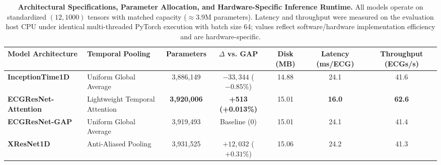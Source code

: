 \begin{table}[t]
\centering
\small
\caption{\textbf{Architectural Specifications, Parameter Allocation, and Hardware-Specific Inference Runtime.} All models operate on standardized $(12, 1000)$ tensors with matched capacity ($\approx 3.9$M parameters). Latency and throughput were measured on the evaluation host CPU under identical multi-threaded PyTorch execution with batch size 64; values reflect software/hardware implementation efficiency and are hardware-specific.}
\label{tab:model_complexity}
\begin{tabular}{llccccc}
\toprule
\textbf{Model Architecture} & \textbf{Temporal Pooling} & \textbf{Parameters} & \textbf{$\Delta$ vs. GAP} & \textbf{Disk (MB)} & \textbf{Latency (ms/ECG)} & \textbf{Throughput (ECGs/s)} \\
\midrule
\textbf{InceptionTime1D} & Uniform Global Average & 3,886,149 & $-33,344$ ($-0.85\%$) & 14.88 & 24.1 & 41.6 \\
\textbf{ECGResNet-Attention} & Lightweight Temporal Attention & \textbf{3,920,006} & \textbf{+513 (+0.013\%)} & 15.01 & \textbf{16.0} & \textbf{62.6} \\
\textbf{ECGResNet-GAP} & Uniform Global Average & 3,919,493 & Baseline (0) & 15.01 & 24.1 & 41.4 \\
\textbf{XResNet1D} & Anti-Aliased Pooling & 3,931,525 & $+12,032$ ($+0.31\%$) & 15.06 & 24.2 & 41.3 \\
\bottomrule
\end{tabular}
\end{table}
